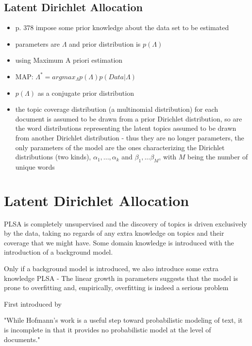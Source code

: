 \documentclass[11pt,a4paper,english,oneside]{book}
\numberwithin{equation}{chapter}
\begin{document}
\subsection{Latent Dirichlet Allocation}\label{LDA}

\begin{itemize}
	\item p. 378 impose some prior knowledge about the data set to be estimated
	\item parameters are $\Lambda$ and prior distribution is $p(\Lambda)$
	\item using Maximum A priori estimation
	\item MAP: $\Lambda^* = arg max_{\Lambda}p(\Lambda)p(Data|\Lambda)$
	\item $p(\Lambda)$ as a conjugate prior distribution
	\item the topic coverage distribution (a multinomial distribution) for each document is assumed to be drawn from a prior Dirichlet distribution, so are the word distributions representing the latent topics assumed to be drawn from another Dirichlet distribution - thus they are no longer parameters, the only parameters of the model are the ones characterizing the Dirichlet distributions (two kinds), $\alpha_1, ... , \alpha_k$ and $\beta_1, ... \beta_M$, with $M$ being the number of unique words
\end{itemize}



\section{Latent Dirichlet Allocation}
PLSA is completely unsupervised and the discovery of topics is driven exclusively by the data, taking no regards of any extra knowledge on topics and their coverage that we might have. Some domain knowledge is introduced with the introduction of a background model. 

 Only if a background model is introduced, we also introduce some extra knowledge 
PLSA - The linear growth in parameters suggests that the model is prone to overfitting and, empirically, overfitting is indeed a serious problem \cite[p. 1001]{Blei.2003}

First introduced by \cite{Blei.2003}

"While Hofmann’s work is a useful step toward probabilistic modeling of text, it is incomplete in that it provides no probabilistic model at the level of documents." \cite[p. 994]{Blei.2003}
\end{document}
